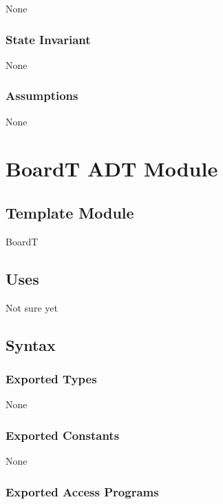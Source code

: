 \documentclass[12pt]{article}
\begin{document}
None

\subsubsection* {State Invariant}

None

\subsubsection* {Assumptions}

None

\newpage




\section* {BoardT ADT Module}

\subsection* {Template Module}

BoardT

\subsection* {Uses}

Not sure yet

\subsection* {Syntax}

\subsubsection* {Exported Types}

None

\subsubsection* {Exported Constants}

None

\subsubsection* {Exported Access Programs}
\end{document}
